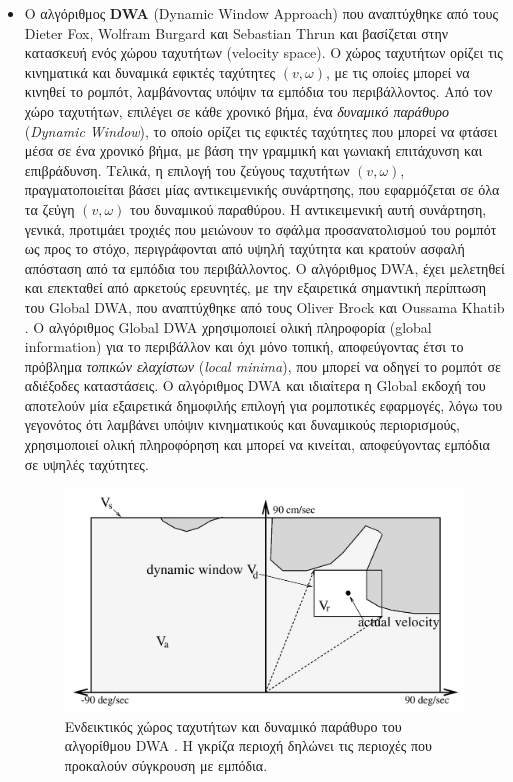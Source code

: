 \begin{itemize}
\item	Ο αλγόριθμος \textbf{DWA} (Dynamic Window Approach) που αναπτύχθηκε από τους Dieter Fox, Wolfram Burgard και Sebastian Thrun \cite{dwa} και βασίζεται στην κατασκευή ενός χώρου ταχυτήτων (velocity space). Ο χώρος ταχυτήτων ορίζει τις κινηματικά και δυναμικά εφικτές ταχύτητες $(v,\omega)$, με τις οποίες μπορεί να κινηθεί το ρομπότ, λαμβάνοντας υπόψιν τα εμπόδια του περιβάλλοντος. Από τον χώρο ταχυτήτων, επιλέγει σε κάθε χρονικό βήμα, ένα \textit{δυναμικό παράθυρο} (\textit{Dynamic Window}), το οποίο ορίζει τις εφικτές ταχύτητες που μπορεί να φτάσει μέσα σε ένα χρονικό βήμα, με βάση την γραμμική και γωνιακή επιτάχυνση και επιβράδυνση. Τελικά, η επιλογή του ζεύγους ταχυτήτων $(v,\omega)$, πραγματοποιείται βάσει μίας αντικειμενικής συνάρτησης, που εφαρμόζεται σε όλα τα ζεύγη $(v, \omega)$ του δυναμικού παραθύρου. Η αντικειμενική αυτή συνάρτηση, γενικά, προτιμάει τροχιές που μειώνουν το σφάλμα προσανατολισμού του ρομπότ ως προς το στόχο, περιγράφονται από υψηλή ταχύτητα και κρατούν ασφαλή απόσταση από τα εμπόδια του περιβάλλοντος. Ο αλγόριθμος DWA, έχει μελετηθεί και επεκταθεί από αρκετούς ερευνητές, με την εξαιρετικά σημαντική περίπτωση του Global DWA, που αναπτύχθηκε από τους Oliver Brock και Oussama Khatib \cite{gdwa}. Ο αλγόριθμος Global DWA χρησιμοποιεί ολική πληροφορία (global information) για το περιβάλλον και όχι μόνο τοπική, αποφεύγοντας έτσι το πρόβλημα \textit{τοπικών ελαχίστων} (\textit{local minima}), που μπορεί να οδηγεί το ρομπότ σε αδιέξοδες καταστάσεις. Ο αλγόριθμος DWA και ιδιαίτερα η Global εκδοχή του αποτελούν μία εξαιρετικά δημοφιλής επιλογή για ρομποτικές εφαρμογές, λόγω του γεγονότος ότι λαμβάνει υπόψιν κινηματικούς και δυναμικούς περιορισμούς, χρησιμοποιεί ολική πληροφόρηση και μπορεί να κινείται, αποφεύγοντας εμπόδια σε υψηλές ταχύτητες.

\begin{figure}[!ht]
	\centering
	\includegraphics[width=0.4\linewidth]{Chapters/Chapter3/Figures/dwa.png}
	\caption[Ενδεικτικός χώρος ταχυτήτων και δυναμικό παράθυρο του αλγορίθμου DWA.]{ Ενδεικτικός χώρος ταχυτήτων και δυναμικό παράθυρο του αλγορίθμου DWA \cite{dwa}. Η γκρίζα περιοχή δηλώνει τις περιοχές που προκαλούν σύγκρουση με εμπόδια.}
	\label{fig:dwa}
\end{figure}	


\end{itemize}
